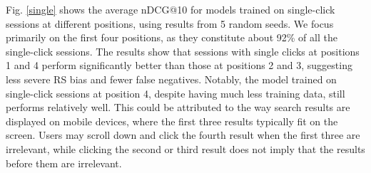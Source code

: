 Fig. \ref{single} shows the average nDCG@10 for models trained on single-click sessions at different positions, using results from 5 random seeds. We focus primarily on the first four positions, as they constitute about 92\% of all the single-click sessions. The results show that sessions with single clicks at positions 1 and 4 perform significantly better than those at positions 2 and 3, suggesting less severe RS bias and fewer false negatives. Notably, the model trained on single-click sessions at position 4, despite having much less training data, still performs relatively well. This could be attributed to the way search results are displayed on mobile devices, where the first three results typically fit on the screen. Users may scroll down and click the fourth result when the first three are irrelevant, while clicking the second or third result does not imply that the results before them are irrelevant.


